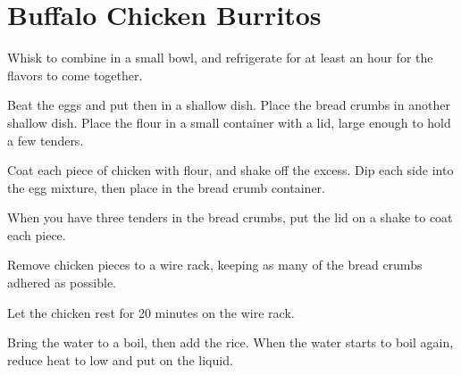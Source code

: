 

\section{Buffalo Chicken Burritos}
\begin{recipe}



Whisk to combine in a small bowl, and refrigerate for at least an hour for the flavors to come together.


Beat the eggs and put then in a shallow dish. Place the bread crumbs in another shallow dish. Place the flour in a small container with a lid, large enough to hold a few tenders.

\columnbreak

Coat each piece of chicken with flour, and shake off the excess. Dip each side into the egg mixture, then place in the bread crumb container.

When you have three tenders in the bread crumbs, put the lid on a shake to coat each piece.

Remove chicken pieces to a wire rack, keeping as many of the bread crumbs adhered as possible.

Let the chicken rest for 20 minutes on the wire rack.


Bring the water to a boil, then add the rice. When the water starts to boil again, reduce heat to low and put on the liquid.

\columnbreak


\end{recipe}
